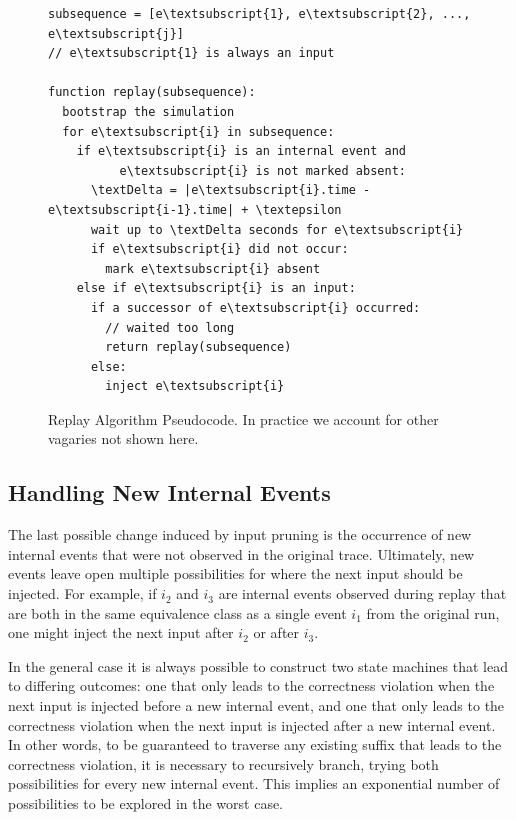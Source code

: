 \begin{figure}
\begin{boxedminipage}{\linewidth}
\begin{Verbatim}[commandchars=\\\{\}]
subsequence = [e\textsubscript{1}, e\textsubscript{2}, ..., e\textsubscript{j}]
// e\textsubscript{1} is always an input

function replay(subsequence):
  bootstrap the simulation
  for e\textsubscript{i} in subsequence:
    if e\textsubscript{i} is an internal event and
          e\textsubscript{i} is not marked absent:
      \textDelta = |e\textsubscript{i}.time - e\textsubscript{i-1}.time| + \textepsilon
      wait up to \textDelta seconds for e\textsubscript{i}
      if e\textsubscript{i} did not occur:
        mark e\textsubscript{i} absent
    else if e\textsubscript{i} is an input:
      if a successor of e\textsubscript{i} occurred:
        // waited too long
        return replay(subsequence)
      else:
        inject e\textsubscript{i}
\end{Verbatim}
\end{boxedminipage}
\caption{Replay Algorithm Pseudocode. In practice we account for other
vagaries not shown here. }
\label{fig:peek}
\end{figure}

\subsection{Handling New Internal Events}
\label{subsec:new_events}

The last possible change induced by input pruning is the occurrence of new
internal events that were not observed in the original trace.
Ultimately, new events leave open multiple possibilities for where
the next input should be injected.
For example, if $i_2$ and $i_3$ are internal events observed
during replay that are both in the same equivalence class as a single event $i_1$ from the
original run, one might inject the next input after $i_2$ or after $i_3$.

In the general case it is always possible to construct two state machines that lead
to differing outcomes: one that only leads to the correctness violation when the next input
is injected before a new internal event, and one that only leads to the
correctness violation when the next input is injected after a new internal
event. In other words, to be guaranteed to traverse any existing suffix that leads
to the correctness violation, it is necessary to recursively branch, trying both
possibilities for every new internal event. This implies an exponential number of
possibilities to be explored in the worst case.

